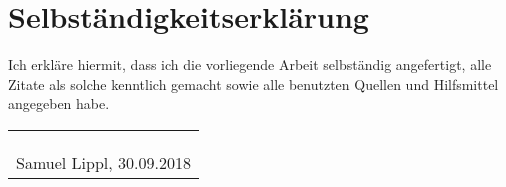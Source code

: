 \setcounter{page}{2}

\chapter*{Selbständigkeitserklärung}

Ich erkläre hiermit, dass ich die vorliegende Arbeit selbständig angefertigt, alle Zitate als solche kenntlich gemacht sowie alle benutzten Quellen und Hilfsmittel angegeben habe.\\

\begin{tabular}{c}
\\\\\\
\\\hline
Samuel Lippl, 30.09.2018
\end{tabular}